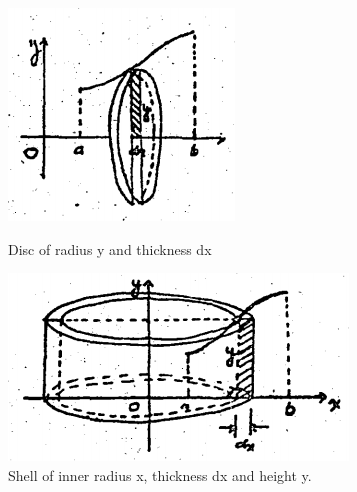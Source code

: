 \documentclass[11pt]{amsbook}
\begin{document}
\begin{figure}[htb]
	\begin{minipage}{0.45\textwidth}
		\centering
    	\includegraphics[width=\textwidth]{images/b1p2-482-fig02}
		\caption{Disc of radius y and thickness dx}
	\end{minipage}
	\begin{minipage}{0.45\textwidth}
		\centering
    	\includegraphics[width=\textwidth]{images/b1p2-482-fig03}
		\caption{Shell of inner radius x, thickness dx and height y.}
	\end{minipage}
\end{figure}

\end{document}
